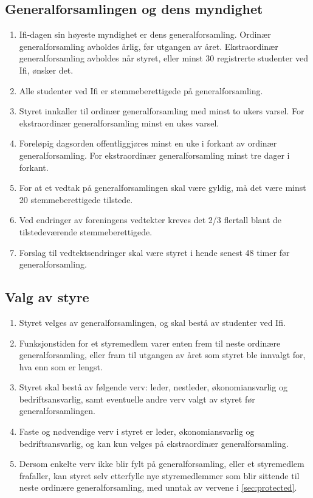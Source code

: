 \documentclass[norsk,a4paper]{article}
\begin{document}
\subsection{Generalforsamlingen og dens myndighet}
\begin{enumerate}
	\item{Ifi-dagen sin høyeste myndighet er dens generalforsamling. Ordinær generalforsamling avholdes årlig, før utgangen av året. Ekstraordinær generalforsamling avholdes når styret, eller minst 30 registrerte studenter ved Ifi, ønsker det.}
	\item{Alle studenter ved Ifi er stemmeberettigede på generalforsamling.}
	\item{Styret innkaller til ordinær generalforsamling med minst to ukers varsel. For ekstraordinær generalforsamling minst en ukes varsel.}
	\item{Foreløpig dagsorden offentliggjøres minst en uke i forkant av ordinær generalforsamling. For ekstraordinær generalforsamling minst tre dager i forkant.}
	\item{For at et vedtak på generalforsamlingen skal være gyldig, må det være minst 20 stemmeberettigede tilstede.}
	\item{Ved endringer av foreningens vedtekter kreves det 2/3 flertall blant de tilstedeværende stemmeberettigede.}
	\item{Forslag til vedtektsendringer skal være styret i hende senest 48 timer før generalforsamling.}
\end{enumerate}

\subsection{Valg av styre}
\begin{enumerate}
	\item{Styret velges av generalforsamlingen, og skal bestå av studenter ved Ifi.}
	\item{Funksjonstiden for et styremedlem varer enten frem til neste ordinære generalforsamling, eller fram til utgangen av året som styret ble innvalgt for, hva enn som er lengst.}
	\item{Styret skal bestå av følgende verv: leder, nestleder, økonomiansvarlig og bedriftsansvarlig, samt eventuelle andre verv valgt av styret før generalforsamlingen.}
	\item Faste og nødvendige verv i styret er leder, økonomiansvarlig og bedriftsansvarlig, og kan kun velges på ekstraordinær generalforsamling.\label{sec:protected}
	\item Dersom enkelte verv ikke blir fylt på generalforsamling, eller et styremedlem frafaller, kan styret selv etterfylle nye styremedlemmer som blir sittende til neste ordinære generalforsamling, med unntak av vervene i \cref{sec:protected}.
\end{enumerate}
\end{document}
